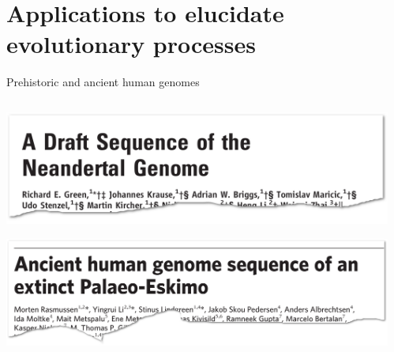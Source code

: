\documentclass[10pt]{beamer}
\begin{document}

\section{Applications to elucidate evolutionary processes}


\begin{frame}{Prehistoric and ancient human genomes}
\begin{columns}
\begin{center}
	\includegraphics[width=\textwidth]{./figures/paper-green.png} \par
	\includegraphics[width=\textwidth]{./figures/paper-rasmussen.png}
\end{center}
\begin{center}

\end{center}
\end{columns}
\end{frame}
\end{document}

